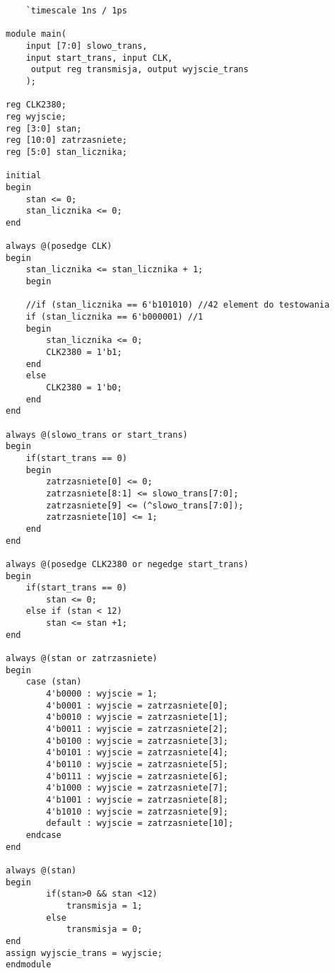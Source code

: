 \begin{lstlisting}
    `timescale 1ns / 1ps

module main(
    input [7:0] slowo_trans,
    input start_trans, input CLK,     
	 output reg transmisja, output wyjscie_trans
    );
	 
reg CLK2380;
reg wyjscie;
reg [3:0] stan;
reg [10:0] zatrzasniete;
reg [5:0] stan_licznika;

initial
begin
	stan <= 0;
	stan_licznika <= 0;
end

always @(posedge CLK)
begin
	stan_licznika <= stan_licznika + 1;
	begin

	//if (stan_licznika == 6'b101010) //42 element do testowania
	if (stan_licznika == 6'b000001) //1
	begin
		stan_licznika <= 0;
		CLK2380 = 1'b1;
	end
	else
		CLK2380 = 1'b0;
	end
end

always @(slowo_trans or start_trans)
begin
	if(start_trans == 0)
	begin
		zatrzasniete[0] <= 0;
		zatrzasniete[8:1] <= slowo_trans[7:0];
		zatrzasniete[9] <= (^slowo_trans[7:0]);
		zatrzasniete[10] <= 1;
	end
end

always @(posedge CLK2380 or negedge start_trans)
begin
	if(start_trans == 0)
		stan <= 0;
	else if (stan < 12)
		stan <= stan +1;
end

always @(stan or zatrzasniete)
begin
	case (stan)
		4'b0000 : wyjscie = 1;
		4'b0001 : wyjscie = zatrzasniete[0];
		4'b0010 : wyjscie = zatrzasniete[1];
		4'b0011 : wyjscie = zatrzasniete[2];
		4'b0100 : wyjscie = zatrzasniete[3];
		4'b0101 : wyjscie = zatrzasniete[4];
		4'b0110 : wyjscie = zatrzasniete[5];
		4'b0111 : wyjscie = zatrzasniete[6];
		4'b1000 : wyjscie = zatrzasniete[7];
		4'b1001 : wyjscie = zatrzasniete[8];
		4'b1010 : wyjscie = zatrzasniete[9];
		default : wyjscie = zatrzasniete[10];
	endcase
end

always @(stan)
begin
		if(stan>0 && stan <12)
			transmisja = 1;
		else
			transmisja = 0;
end
assign wyjscie_trans = wyjscie;
endmodule
\end{lstlisting}